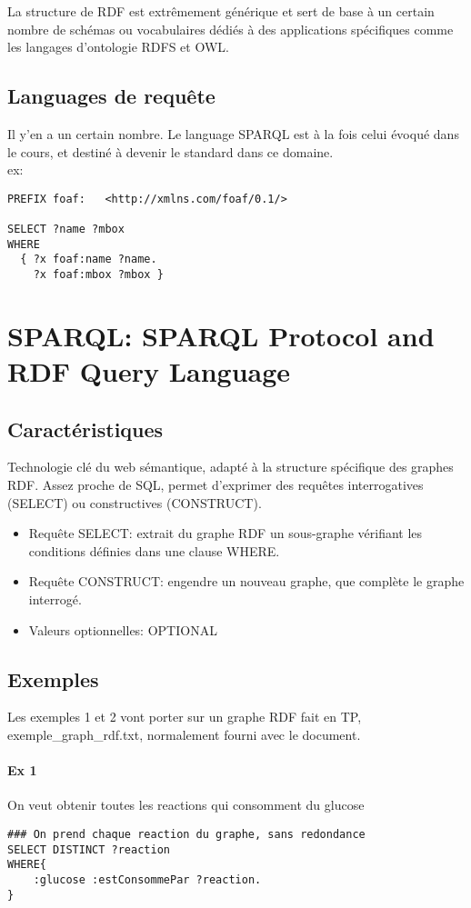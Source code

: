 \documentclass[11pt,a4paper]{article}
\begin{document}
La structure de RDF est extrêmement générique et sert de base à un certain nombre de schémas ou vocabulaires dédiés à des applications spécifiques comme les langages d'ontologie RDFS et OWL.

\subsection{Languages de requête}
Il y'en a un certain nombre. Le language SPARQL est à la fois celui évoqué dans le cours, et destiné à devenir le standard dans ce domaine.\\
ex:
\begin{lstlisting}
PREFIX foaf:   <http://xmlns.com/foaf/0.1/>

SELECT ?name ?mbox
WHERE
  { ?x foaf:name ?name.
    ?x foaf:mbox ?mbox }
\end{lstlisting}

\section{SPARQL: SPARQL Protocol and RDF Query Language}
\subsection{Caractéristiques}
Technologie clé du web sémantique, adapté à la structure spécifique des graphes RDF. Assez proche de SQL, permet d'exprimer des requêtes interrogatives (SELECT) ou constructives (CONSTRUCT).
\begin{itemize}
    \item Requête SELECT: extrait du graphe RDF un sous-graphe vérifiant les conditions définies dans une clause WHERE.
    \item Requête CONSTRUCT: engendre un nouveau graphe, que complète le graphe interrogé.
    \item Valeurs optionnelles: OPTIONAL
\end{itemize}

\subsection{Exemples}
Les exemples 1 et 2 vont porter sur un graphe RDF fait en TP, exemple\_graph\_rdf.txt, normalement fourni avec le document.


\paragraph{Ex 1}
On veut obtenir toutes les reactions qui consomment du glucose
\begin{lstlisting}
### On prend chaque reaction du graphe, sans redondance
SELECT DISTINCT ?reaction
WHERE{
    :glucose :estConsommePar ?reaction.
}
\end{lstlisting}
\end{document}
